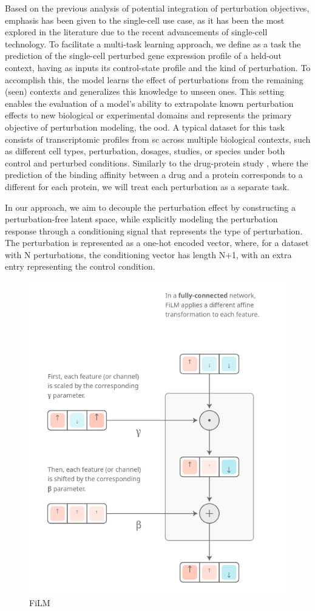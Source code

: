 \documentclass[12pt, a4paper]{article}
\begin{document}
Based on the previous analysis of potential integration of perturbation objectives, emphasis has been given to the single-cell use case, as it has been the most explored in the literature due to the recent advancements of single-cell technology. 
To facilitate a multi-task learning approach, we define as a task the prediction of the single-cell perturbed gene expression profile of a held-out context, having as inputs its control-state profile and the kind of perturbation. To accomplish this, the model learns the effect of perturbations from the remaining (seen) contexts and generalizes this knowledge to unseen ones. This setting enables the evaluation of a model's ability to extrapolate known perturbation effects to new biological or experimental domains and represents the primary objective of perturbation modeling, the \gls{ood}. A typical dataset for this task consists of transcriptomic profiles from \gls{sc} across multiple biological contexts, such as different cell types, perturbation, dosages, studies, or species under both control and perturbed conditions. Similarly to the drug-protein study \cite{allenspachNeuralMultitaskLearning2024}, where the prediction of the binding affinity between a drug and a protein corresponds to a different for each protein, we will treat each perturbation as a separate task.



In our approach, we aim to decouple the perturbation effect by constructing a perturbation-free latent space, while explicitly modeling the perturbation response through a conditioning signal that represents the type of perturbation.
The perturbation is represented as a one-hot encoded vector, where, for a dataset with N perturbations, the conditioning vector has length N+1, with an extra entry representing the control condition.


\begin{figure}
  \begin{center}
    \includegraphics[width=.45\textwidth]{film_layers.png}
  \end{center}
  \caption{FiLM \cite{dumoulin2018feature-wise}}
\end{figure}
\end{document}
